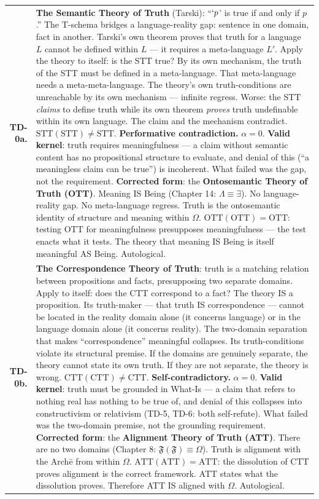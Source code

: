 \documentclass[10pt, openany, oneside]{book}
\renewcommand{\footnotesize}{\fontsize{8.5}{11}\selectfont}
\begin{document}
{\footnotesize
\noindent\begin{tabular}{r p{}}
\textbf{TD-0a.} & \textbf{The Semantic Theory of Truth} (Tarski): ``$`p$' is true if and only if $p$.'' The T-schema bridges a language-reality gap: sentence in one domain, fact in another. Tarski's own theorem proves that truth for a language $L$ cannot be defined within $L$ --- it requires a meta-language $L'$. Apply the theory to itself: is the STT true? By its own mechanism, the truth of the STT must be defined in a meta-language. That meta-language needs a meta-meta-language. The theory's own truth-conditions are unreachable by its own mechanism --- infinite regress. Worse: the STT \textit{claims} to define truth while its own theorem \textit{proves} truth undefinable within its own language. The claim and the mechanism contradict. $\text{STT}(\text{STT}) \neq \text{STT}$. \textbf{Performative contradiction.} $\alpha = 0$. \textbf{Valid kernel}: truth requires meaningfulness --- a claim without semantic content has no propositional structure to evaluate, and denial of this (``a meaningless claim can be true'') is incoherent. What failed was the gap, not the requirement. \textbf{Corrected form}: the \textbf{Ontosemantic Theory of Truth (OTT)}. Meaning IS Being (Chapter 14: $\Lambda \equiv \exists$). No language-reality gap. No meta-language regress. Truth is the ontosemantic identity of structure and meaning within $\Omega$. $\text{OTT}(\text{OTT}) = \text{OTT}$: testing OTT for meaningfulness presupposes meaningfulness --- the test enacts what it tests. The theory that meaning IS Being is itself meaningful AS Being. Autological. \\[0.5em]
\textbf{TD-0b.} & \textbf{The Correspondence Theory of Truth}: truth is a matching relation between propositions and facts, presupposing two separate domains. Apply to itself: does the CTT correspond to a fact? The theory IS a proposition. Its truth-maker --- that truth IS correspondence --- cannot be located in the reality domain alone (it concerns language) or in the language domain alone (it concerns reality). The two-domain separation that makes ``correspondence'' meaningful collapses. Its truth-conditions violate its structural premise. If the domains are genuinely separate, the theory cannot state its own truth. If they are not separate, the theory is wrong. $\text{CTT}(\text{CTT}) \neq \text{CTT}$. \textbf{Self-contradictory.} $\alpha = 0$. \textbf{Valid kernel}: truth must be grounded in What-Is --- a claim that refers to nothing real has nothing to be true of, and denial of this collapses into constructivism or relativism (TD-5, TD-6: both self-refute). What failed was the two-domain premise, not the grounding requirement. \textbf{Corrected form}: the \textbf{Alignment Theory of Truth (ATT)}. There are no two domains (Chapter 8: $\mathfrak{F}(\mathfrak{F}) \equiv \Omega$). Truth is alignment with the Arch\={e} from within $\Omega$. $\text{ATT}(\text{ATT}) = \text{ATT}$: the dissolution of CTT proves alignment is the correct framework. ATT states what the dissolution proves. Therefore ATT IS aligned with $\Omega$. Autological. \\[0.5em]

\end{tabular}}
\end{document}
